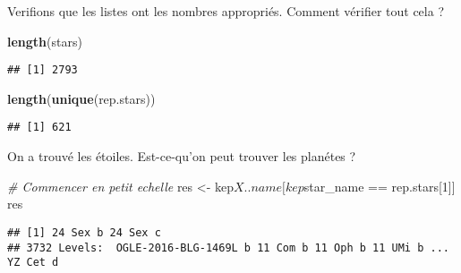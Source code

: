 \documentclass[]{article}
\newenvironment{Shaded}{\begin{snugshade}}{\end{snugshade}}
\newcommand{\KeywordTok}[1]{\textcolor[rgb]{0.13,0.29,0.53}{\textbf{{#1}}}}
\newcommand{\DecValTok}[1]{\textcolor[rgb]{0.00,0.00,0.81}{{#1}}}
\newcommand{\StringTok}[1]{\textcolor[rgb]{0.31,0.60,0.02}{{#1}}}
\newcommand{\CommentTok}[1]{\textcolor[rgb]{0.56,0.35,0.01}{\textit{{#1}}}}
\newcommand{\NormalTok}[1]{{#1}}
\begin{document}
Verifions que les listes ont les nombres appropriés. Comment vérifier
tout cela ?

\begin{Shaded}
\begin{Highlighting}[]
\KeywordTok{length}\NormalTok{(stars)}
\end{Highlighting}
\end{Shaded}

\begin{verbatim}
## [1] 2793
\end{verbatim}

\begin{Shaded}
\begin{Highlighting}[]
\KeywordTok{length}\NormalTok{(}\KeywordTok{unique}\NormalTok{(rep.stars))}
\end{Highlighting}
\end{Shaded}

\begin{verbatim}
## [1] 621
\end{verbatim}

On a trouvé les étoiles. Est-ce-qu'on peut trouver les planétes ?

\begin{Shaded}
\begin{Highlighting}[]
\CommentTok{# Commencer en petit echelle}
\NormalTok{res <-}\StringTok{ }\NormalTok{kep$X..name[kep$star_name ==}\StringTok{ }\NormalTok{rep.stars[}\DecValTok{1}\NormalTok{]]}
\NormalTok{res}
\end{Highlighting}
\end{Shaded}

\begin{verbatim}
## [1] 24 Sex b 24 Sex c
## 3732 Levels:  OGLE-2016-BLG-1469L b 11 Com b 11 Oph b 11 UMi b ... YZ Cet d
\end{verbatim}

\begin{Shaded}
\end{Shaded}
\end{document}
